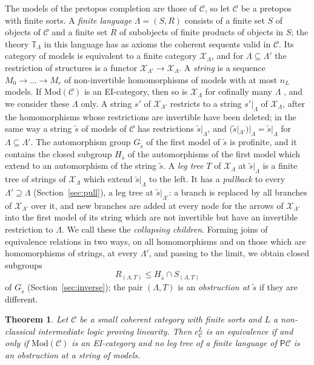 \documentclass[11pt]{amsart}
\newtheorem{thm}{Theorem}[section]
\theoremstyle{definition}
\newcommand{\Mod}{\mathrm{Mod}}
\newcommand{\PP}{\mathsf P}
\newcommand{\cX}{\mathcal X}
\newcommand{\cC}{\mathcal C}
\newcommand{\bT}{\mathbb T}
\begin{document}
The models of the pretopos completion are those of $\cC$, so let $\cC$
be a pretopos with finite sorts. A \emph{finite language}
$\Lambda=(S,R)$ consists of a finite set $S$ of objects of $\cC$ and a
finite set $R$ of subobjects of finite products of objects in $S$; the
theory $\bT_\Lambda$ in this language has as axioms the coherent
sequents valid in $\cC$. Its category of models is equivalent to a
finite category $\cX_\Lambda$, and for $\Lambda\subseteq\Lambda'$ the
restriction of structures is a functor
$\cX_{\Lambda'}\to\cX_\Lambda$. A \emph{string} is a sequence
$M_0\to\dots\to M_r$ of non-invertible homomorphisms of models with at
most $n_L$ models. If $\Mod(\cC)$ is an EI-category, then so is
$\cX_\Lambda$ for cofinally many $\Lambda$ \cite{Finsorts}, and we
consider these $\Lambda$ only. A string $s'$ of $\cX_{\Lambda'}$
restricts to a string $s'|_\Lambda$ of $\cX_\Lambda$, after the
homomorphisms whose restrictions are invertible have been deleted; in
the same way a string $\tilde s$ of models of $\cC$ has restrictions
$\tilde s|_\Lambda$, and $(\tilde s|_{\Lambda'})|_\Lambda=\tilde
s|_\Lambda$ for $\Lambda\subseteq\Lambda'$. The automorphism group
$G_{\tilde s}$ of the first model of $\tilde s$ is profinite, and it
contains the closed subgroup $H_{\tilde s}$ of the automorphisms of
the first model which extend to an automorphism of the string $\tilde
s$. A \emph{leg tree}
$T$ of $\cX_\Lambda$ at $\tilde s|_\Lambda$ \cite[Def.~6.14]{Strings}
is a finite tree of strings of $\cX_\Lambda$ which extend $\tilde
s|_\Lambda$ to the left. It has a \emph{pullback} to every
$\Lambda'\supseteq\Lambda$ (Section~\ref{sec:pull}), a leg tree at
$\tilde s|_{\Lambda'}$: a branch is replaced by all branches of
$\cX_{\Lambda'}$ over it, and new branches are added at every node for
the arrows of $\cX_{\Lambda'}$ into the first model of its string
which are not invertible but have an invertible restriction to
$\Lambda$. We call these the \emph{collapsing children}. Forming joins
of equivalence relations in two ways, on all homomorphisms and on
those which are homomorphisms of strings, at every $\Lambda'$, and
passing to the limit, we obtain closed subgroups
\[
R_{(\Lambda,T)}\le H_{\tilde s}\cap S_{(\Lambda,T)}
\]
of $G_{\tilde s}$ (Section~\ref{sec:inverse}); the pair $(\Lambda,T)$
is an \emph{obstruction at $\tilde s$} if they are different.

\begin{thm}\label{thm:A}
Let $\cC$ be a small coherent category with finite sorts and $L$ a
non-classical intermediate logic proving linearity. Then $c^L_\cC$ is
an equivalence if and only if $\Mod(\cC)$ is an EI-category and no leg
tree of a finite language of $\PP\cC$ is an obstruction at a string of
models.
\end{thm}
\end{document}
